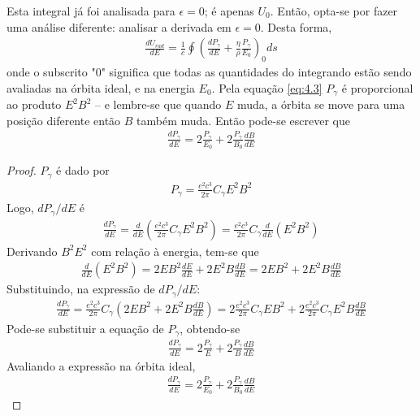 Esta integral já foi analisada para $\epsilon=0$; é apenas $U_0$. Então, opta-se por fazer uma análise diferente: analisar a derivada em $\epsilon=0$. Desta forma,
\begin{align}
	\frac{dU_{rad}}{dE} = \frac{1}{c} \oint \left(\frac{dP_\gamma}{dE}+ \frac{\eta}{\rho}\frac{P_\gamma}{E_0}\right)_0 ds\label{eq:4.14}
\end{align}
onde o subscrito "0" significa que todas as quantidades do integrando estão sendo avaliadas na órbita ideal, e na energia $E_0$. Pela equação \eqref{eq:4.3} $P_\gamma$ é proporcional ao produto $E^2B^2$ -- e lembre-se que quando $E$ muda, a órbita se move para uma posição diferente então $B$ também muda. Então pode-se escrever que
\begin{align*}
	\frac{dP_\gamma}{dE} = 2\frac{P_\gamma}{E_0} + 2\frac{P_\gamma}{B_0}\frac{dB}{dE}
\end{align*}

\begin{proof}
	$P_\gamma$ é dado por
	\begin{align*}
		P_\gamma = \frac{e^2c^3}{2\pi}C_\gamma E^2 B^2
	\end{align*}
	Logo, $dP_\gamma/dE$ é
	\begin{align*}
		\frac{dP_\gamma}{dE} = \frac{d}{dE}\left(\frac{e^2c^3}{2\pi}C_\gamma E^2 B^2\right) = \frac{e^2c^3}{2\pi}C_\gamma \frac{d}{dE}(E^2B^2)
	\end{align*}
	Derivando $B^2E^2$ com relação à energia, tem-se que
	\begin{align*}
		\frac{d}{dE}(E^2B^2) = 2EB^2\frac{dE}{dE} + 2E^2B\frac{dB}{dE} = 2EB^2 + 2E^2B\frac{dB}{dE}
	\end{align*}
	Substituindo, na expressão de $dP_\gamma/dE$:
	\begin{align*}
		\frac{dP_\gamma}{dE} = \frac{e^2c^3}{2\pi}C_\gamma \left(2EB^2 + 2E^2B\frac{dB}{dE}\right) = 2\frac{e^2c^3}{2\pi}C_\gamma E B^2 + 2\frac{e^2c^3}{2\pi}C_\gamma E^2 B \frac{dB}{dE}
	\end{align*}
	Pode-se substituir a equação de $P_\gamma$, obtendo-se
	\begin{align*}
		\frac{dP_\gamma}{dE} = 2\frac{P_\gamma}{E} + 2\frac{P_\gamma}{B}\frac{dB}{dE}
	\end{align*}
	Avaliando a expressão na órbita ideal,
	\begin{align*}
		\frac{dP_\gamma}{dE} = 2\frac{P_\gamma}{E_0} + 2\frac{P_\gamma}{B_0}\frac{dB}{dE}
	\end{align*}
\end{proof}

